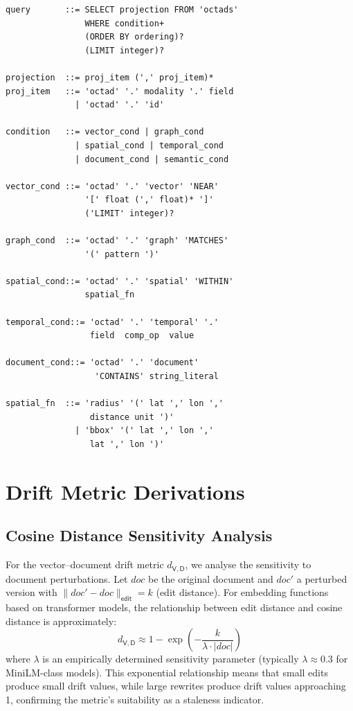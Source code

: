 \documentclass[11pt,twocolumn]{article}
\begin{document}
\begin{lstlisting}[language={},caption={VQL grammar excerpt (EBNF)},
  basicstyle=\ttfamily\scriptsize]
query       ::= SELECT projection FROM 'octads'
                WHERE condition+
                (ORDER BY ordering)?
                (LIMIT integer)?

projection  ::= proj_item (',' proj_item)*
proj_item   ::= 'octad' '.' modality '.' field
              | 'octad' '.' 'id'

condition   ::= vector_cond | graph_cond
              | spatial_cond | temporal_cond
              | document_cond | semantic_cond

vector_cond ::= 'octad' '.' 'vector' 'NEAR'
                '[' float (',' float)* ']'
                ('LIMIT' integer)?

graph_cond  ::= 'octad' '.' 'graph' 'MATCHES'
                '(' pattern ')'

spatial_cond::= 'octad' '.' 'spatial' 'WITHIN'
                spatial_fn

temporal_cond::= 'octad' '.' 'temporal' '.'
                 field  comp_op  value

document_cond::= 'octad' '.' 'document'
                  'CONTAINS' string_literal

spatial_fn  ::= 'radius' '(' lat ',' lon ','
                 distance unit ')'
              | 'bbox' '(' lat ',' lon ','
                 lat ',' lon ')'
\end{lstlisting}

\section{Drift Metric Derivations}\label{app:drift-derivations}

\subsection{Cosine Distance Sensitivity Analysis}

For the vector--document drift metric $d_{\mathsf{V},\mathsf{D}}$, we
analyse the sensitivity to document perturbations.  Let $\mathit{doc}$ be
the original document and $\mathit{doc}'$ a perturbed version with
$\|\mathit{doc}' - \mathit{doc}\|_\mathsf{edit} = k$ (edit distance).
For embedding functions based on transformer models, the relationship
between edit distance and cosine distance is approximately:
\[
  d_{\mathsf{V},\mathsf{D}} \approx
    1 - \exp\left(-\frac{k}{\lambda \cdot |\mathit{doc}|}\right)
\]
where $\lambda$ is an empirically determined sensitivity parameter
(typically $\lambda \approx 0.3$ for MiniLM-class models).  This
exponential relationship means that small edits produce small drift values,
while large rewrites produce drift values approaching 1, confirming the
metric's suitability as a staleness indicator.
\end{document}
